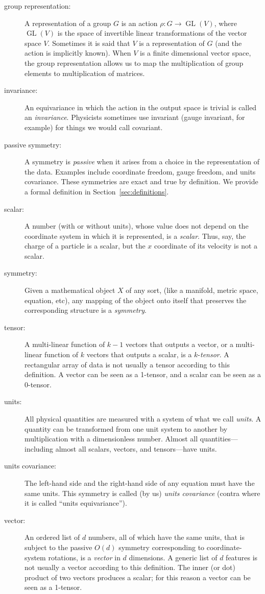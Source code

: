 \documentclass[preprint]{article} %
\newcommand{\sectionname}{Section}
\newcommand{\secref}[1]{\sectionname~\ref{#1}}
\begin{document}
\begin{description}
\item[group representation:] A representation of a group $G$ is an action $\rho: G \to \operatorname{GL}(V)$, where $\operatorname{GL}(V)$ is the space of invertible linear transformations of the vector space $V$. Sometimes it is said that $V$ is a representation of $G$ (and the action is implicitly known). When $V$ is a finite dimensional vector space, the group representation allows us to map the multiplication of group elements to multiplication of matrices. 
\item[invariance:]
An equivariance in which the action in the output space is trivial is called an \emph{invariance}. Physicists sometimes use invariant (gauge invariant, for example) for things we would call covariant.
\item[passive symmetry:]
A symmetry is \emph{passive} when it arises from a choice in the representation of the data. 
Examples include coordinate freedom, gauge freedom, and units covariance.
These symmetries are exact and true by definition.
We provide a formal definition in \secref{sec:definitions}.
\item[scalar:]
A number (with or without units), whose value does not depend on the coordinate system in which it is represented, is a \emph{scalar}.
Thus, say, the charge of a particle is a scalar, but the $x$ coordinate of its velocity is not a scalar.
\item[symmetry:]
Given a mathematical object $X$ of any sort, (like a manifold, metric space, equation, etc), any mapping of the object onto itself that preserves the corresponding structure is a \emph{symmetry}.
\item[tensor:]
A multi-linear function of $k-1$ vectors that outputs a vector, or a multi-linear function of $k$ vectors that outputs a scalar, is a $k$-\emph{tensor}.
A rectangular array of data is not usually a tensor according to this definition.
A vector can be seen as a 1-tensor, and a scalar can be seen as a 0-tensor.
\item[units:]
All physical quantities are measured with a system of what we call \emph{units}.
A quantity can be transformed from one unit system to another by multiplication with a dimensionless number.
Almost all quantities---including almost all scalars, vectors, and tensors---have units.
\item[units covariance:]
The left-hand side and the right-hand side of any equation must have the same units.
This symmetry is called (by us) \emph{units covariance} (contra \citealt{villar2022dimensionless} where it is called ``units equivariance'').
\item[vector:]
An ordered list of $d$ numbers, all of which have the same units, that is subject to the passive $O(d)$ symmetry corresponding to coordinate-system rotations, is a \emph{vector} in $d$ dimensions.
A generic list of $d$ features is not usually a vector according to this definition.
The inner (or dot) product of two vectors produces a scalar; for this reason a vector can be seen as a 1-tensor.
\end{description}
\end{document}
